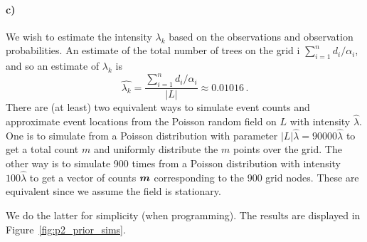 \paragraph{c)}
We wish to estimate the intensity $\lambda_k$ based on the observations and observation probabilities. An estimate of the total number of trees on the grid i $\sum_{i=1}^n d_i / \alpha_i$, and so an estimate of $\lambda_k$ is
%
\begin{equation*}
    \hat{\lambda_k} = \frac{\sum_{i=1}^n d_i / \alpha_i}{|L|} \approx 0.01016 \, .
\end{equation*}
%
There are (at least) two equivalent ways to simulate event counts and approximate event locations from the Poisson random field on $L$ with intensity $\hat{\lambda}$. One is to simulate from a Poisson distribution with parameter $|L|\hat{\lambda} = 90000\hat{\lambda}$ to get a total count $m$ and uniformly distribute the $m$ points over the grid. The other way is to simulate 900 times from a Poisson distribution with intensity $100\hat{\lambda}$ to get a vector of counts $\bm{m}$ corresponding to the 900 grid nodes. These are equivalent since we assume the field is stationary.

We do the latter for simplicity (when programming). The results are displayed in Figure~\ref{fig:p2_prior_sims}.

